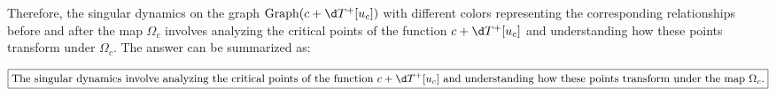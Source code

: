 Therefore, the singular dynamics on the graph \(\operatorname{Graph}(c + \d T^+[u_c])\) with different colors representing the corresponding relationships before and after the map \(\Omega_c\) involves analyzing the critical points of the function \(c + \d T^+[u_c]\) and understanding how these points transform under \(\Omega_c\). The answer can be summarized as:

\[
\boxed{\text{The singular dynamics involve analyzing the critical points of the function } c + \d T^+[u_c] \text{ and understanding how these points transform under the map } \Omega_c.}
\]
